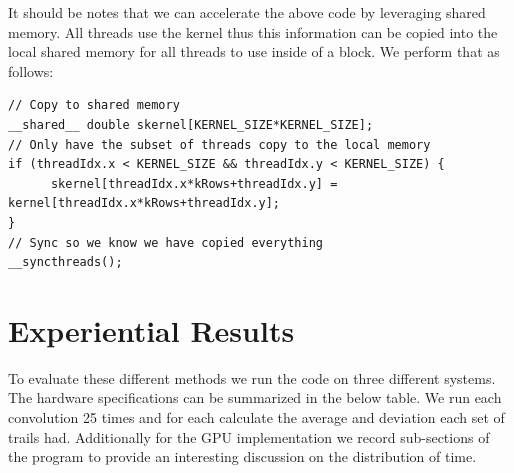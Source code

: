 \documentclass{article}
\begin{document}
It should be notes that we can accelerate the above code by leveraging shared memory.
All threads use the kernel thus this information can be copied into the local shared memory for all threads to use inside of a block.
We perform that as follows:

\begin{verbatim}
// Copy to shared memory
__shared__ double skernel[KERNEL_SIZE*KERNEL_SIZE];
// Only have the subset of threads copy to the local memory
if (threadIdx.x < KERNEL_SIZE && threadIdx.y < KERNEL_SIZE) {
      skernel[threadIdx.x*kRows+threadIdx.y] = kernel[threadIdx.x*kRows+threadIdx.y];
}
// Sync so we know we have copied everything
__syncthreads();
\end{verbatim}



\section{Experiential Results}

To evaluate these different methods we run the code on three different systems.
The hardware specifications can be summarized in the below table.
We run each convolution 25 times and for each calculate the average and deviation each set of trails had.
Additionally for the GPU implementation we record sub-sections of the program to provide an interesting discussion on the distribution of time.
\end{document}
